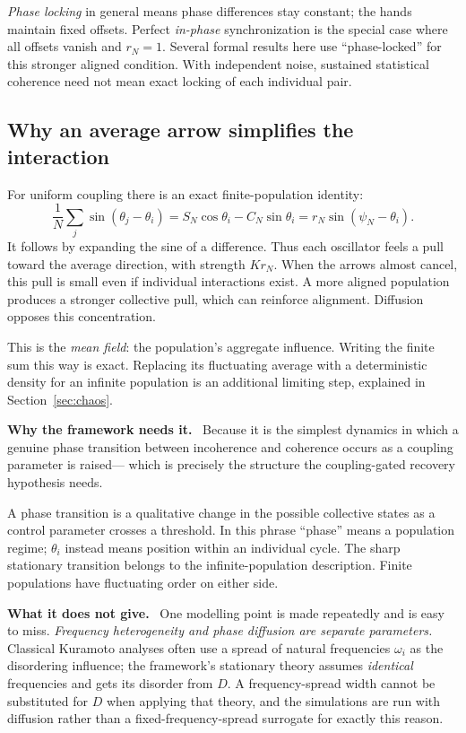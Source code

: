 \documentclass[11pt]{article}
\newcommand{\why}{\par\smallskip\noindent\textbf{Why the framework needs it.}\ }
\newcommand{\scope}{\par\smallskip\noindent\textbf{What it does not give.}\ }
\begin{document}
\emph{Phase locking} in general means phase differences stay constant; the
hands maintain fixed offsets. Perfect \emph{in-phase} synchronization is the
special case where all offsets vanish and $r_N=1$. Several formal results here
use ``phase-locked'' for this stronger aligned condition. With independent
noise, sustained statistical coherence need not mean exact locking of each
individual pair.

\subsection{Why an average arrow simplifies the interaction}

For uniform coupling there is an exact finite-population identity:
\[
 \frac1N\sum_j\sin(\theta_j-\theta_i)
 =S_N\cos\theta_i-C_N\sin\theta_i
 =r_N\sin(\psi_N-\theta_i).
\]
It follows by expanding the sine of a difference. Thus each oscillator feels
a pull toward the average direction, with strength $Kr_N$. When the arrows
almost cancel, this pull is small even if individual interactions exist. A
more aligned population produces a stronger collective pull, which can
reinforce alignment. Diffusion opposes this concentration.

This is the \emph{mean field}: the population's aggregate influence. Writing
the finite sum this way is exact. Replacing its fluctuating average with a
deterministic density for an infinite population is an additional limiting
step, explained in Section~\ref{sec:chaos}.

\why
Because it is the simplest dynamics in which a genuine phase transition
between incoherence and coherence occurs as a coupling parameter is raised---
which is precisely the structure the coupling-gated recovery hypothesis needs.

A phase transition is a qualitative change in the possible collective states
as a control parameter crosses a threshold. In this phrase ``phase'' means
a population regime; $\theta_i$ instead means position within an individual
cycle. The sharp stationary transition belongs to the infinite-population
description. Finite populations have fluctuating order on either side.

\scope
One modelling point is made repeatedly and is easy to miss. \emph{Frequency
heterogeneity and phase diffusion are separate parameters.} Classical Kuramoto
analyses often use a spread of natural frequencies $\omega_i$ as the
disordering influence; the framework's stationary theory assumes
\emph{identical} frequencies and gets its disorder from $D$. A frequency-spread
width cannot be substituted for $D$ when applying that theory, and the
simulations are run with diffusion rather than a fixed-frequency-spread surrogate
for exactly this reason.
\end{document}

